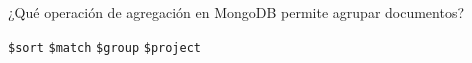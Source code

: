 \question[1] ¿Qué operación de agregación en MongoDB permite agrupar documentos?
\begin{choices}
\choice \texttt{\$sort}
\choice \texttt{\$match}
\CorrectChoice \texttt{\$group}
\choice \texttt{\$project}
\end{choices}